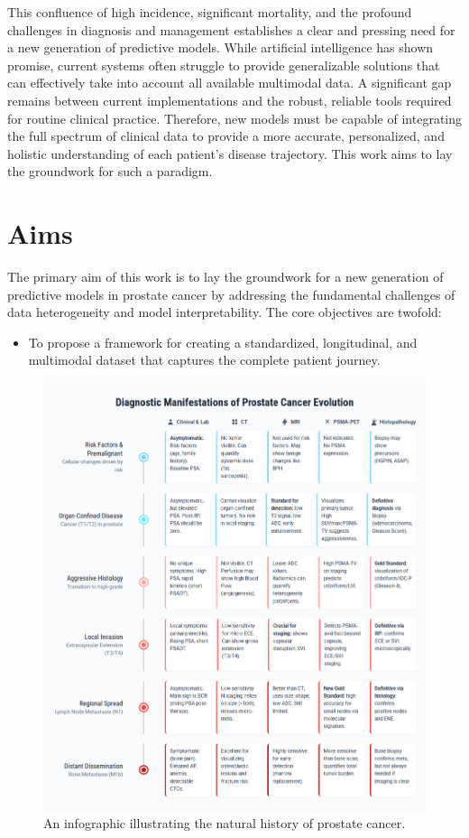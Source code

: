 \documentclass[11pt, a4paper]{article}
\begin{document}
This confluence of high incidence, significant mortality, and the profound challenges in diagnosis and management establishes a clear and pressing need for a new generation of predictive models. While artificial intelligence has shown promise, current systems often struggle to provide generalizable solutions that can effectively take into account all available multimodal data. A significant gap remains between current implementations and the robust, reliable tools required for routine clinical practice. Therefore, new models must be capable of integrating the full spectrum of clinical data to provide a more accurate, personalized, and holistic understanding of each patient's disease trajectory. This work aims to lay the groundwork for such a paradigm.

\section{Aims}
The primary aim of this work is to lay the groundwork for a new generation of predictive models in prostate cancer by addressing the fundamental challenges of data heterogeneity and model interpretability. The core objectives are twofold:
\begin{itemize}
    \item To propose a framework for creating a standardized, longitudinal, and multimodal dataset that captures the complete patient journey.
\end{itemize}

\begin{figure}[H]
\centering
 \includegraphics[width=\textwidth]{pe.png}
 \caption{An infographic illustrating the natural history of prostate cancer.}
\label{fig:prostate_evolution}
\end{figure}
\end{document}
